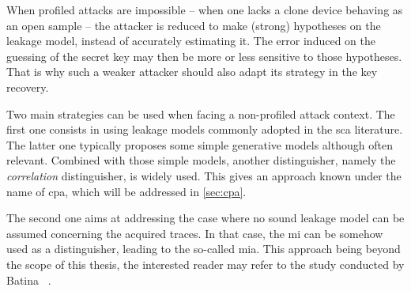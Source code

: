 When profiled attacks are impossible -- \eg{} when one lacks a clone device behaving as an open sample -- the attacker is reduced to make (strong) hypotheses on the leakage model, instead of accurately estimating it.
The error induced on the guessing of the secret key may then be more or less sensitive to those hypotheses.
That is why such a weaker attacker should also adapt its strategy in the key recovery.

Two main strategies can be used when facing a non-profiled attack context.
The first one consists in using leakage models commonly adopted in the \gls{sca} literature.
The latter one typically proposes some simple generative models although often relevant.
Combined with those simple models, another distinguisher, namely the \emph{correlation} distinguisher, is widely used.
This gives an approach known under the name of \gls{cpa}, which will be addressed in \autoref{sec:cpa}.

The second one aims at addressing the case where no sound leakage model can be assumed concerning the acquired traces.
In that case, the \gls{mi} can be somehow used as a distinguisher, leading to the so-called \gls{mia}.
This approach being beyond the scope of this thesis, the interested reader may refer to the study conducted by Batina \etal{}~\cite{batina_mutual_2011}.

